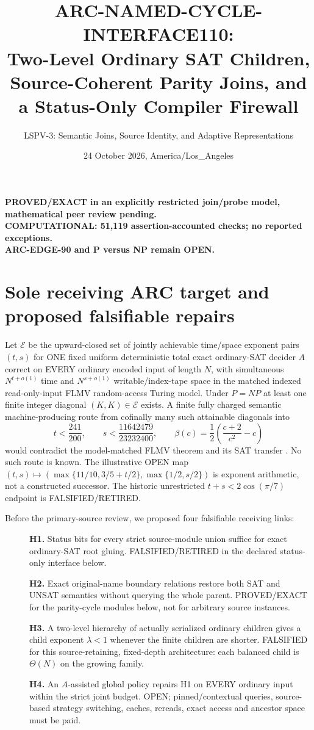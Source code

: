 \documentclass[11pt]{article}
\title{ARC-NAMED-CYCLE-INTERFACE110:\\ Two-Level Ordinary SAT Children, Source-Coherent Parity Joins, and a Status-Only Compiler Firewall}
\author{LSPV-3: Semantic Joins, Source Identity, and Adaptive Representations}
\date{24 October 2026, America/Los\_Angeles}
\newcommand{\E}{\mathcal E}
\begin{document}
\maketitle
\begin{center}
\textbf{PROVED/EXACT in an explicitly restricted join/probe model, mathematical peer review pending.}\\
\textbf{COMPUTATIONAL: 51,119 assertion-accounted checks; no reported exceptions.}\\
\textbf{ARC-EDGE-90 and P versus NP remain OPEN.}
\end{center}

\section{Sole receiving ARC target and proposed falsifiable repairs}
Let \(\E\) be the upward-closed set of jointly achievable time/space exponent pairs \((t,s)\) for ONE fixed uniform deterministic total exact ordinary-SAT decider \(A\) correct on EVERY ordinary encoded input of length \(N\), with simultaneous \(N^{t+o(1)}\) time and \(N^{s+o(1)}\) writable/index-tape space in the matched indexed read-only-input FLMV random-access Turing model. Under \(P=NP\) at least one finite integer diagonal \((K,K)\in\E\) exists. A finite fully charged semantic machine-producing route from cofinally many such attainable diagonals into
\[
t<\frac{241}{200},\qquad s<\frac{11642479}{23232400},\qquad
\beta(c)=\frac12\left(\frac{c+2}{c^2}-c\right)
\]
would contradict the model-matched FLMV theorem and its SAT transfer \cite{flmv}. No such route is known. The illustrative OPEN map
\((t,s)\mapsto(\max\{11/10,3/5+t/2\},\max\{1/2,s/2\})\)
is exponent arithmetic, not a constructed successor. The historic unrestricted
\(t+s<2\cos(\pi/7)\) endpoint is FALSIFIED/RETIRED.

Before the primary-source review, we proposed four falsifiable receiving links:
\begin{description}
\item[] \textbf{H1.} Status bits for every strict source-module union suffice for exact ordinary-SAT root gluing. FALSIFIED/RETIRED in the declared status-only interface below.
\item[] \textbf{H2.} Exact original-name boundary relations restore both SAT and UNSAT semantics without querying the whole parent. PROVED/EXACT for the parity-cycle modules below, not for arbitrary source instances.
\item[] \textbf{H3.} A two-level hierarchy of actually serialized ordinary children gives a child exponent \(\lambda<1\) whenever the finite children are shorter. FALSIFIED for this source-retaining, fixed-depth architecture: each balanced child is \(\Theta(N)\) on the growing family.
\item[] \textbf{H4.} An \(A\)-assisted global policy repairs H1 on EVERY ordinary input within the strict joint budget. OPEN; pinned/contextual queries, source-based strategy switching, caches, rereads, exact access and ancestor space must be paid.
\end{description}
\end{document}
